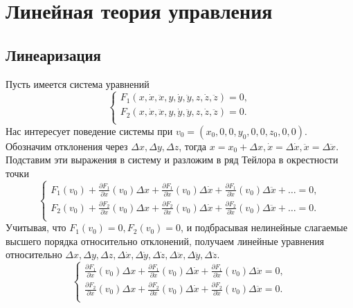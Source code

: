 \documentclass[A4]{article}
\begin{document}
\section{Линейная теория управления}
\subsection{Линеаризация}
Пусть имеется система уравнений
\begin{equation}
\left\{\begin{array}{cc}
F_1(x,\dot{x},\ddot{x},y,\dot{y},\ddot{y},z,\dot{z},\ddot{z})=0,\\
F_2(x,\dot{x},\ddot{x},y,\dot{y},\ddot{y},z,\dot{z},\ddot{z})=0.\\
\end{array}\right.
\end{equation}
Нас интересует поведение системы при $v_0=(x_0,0,0,y_0,0,0,z_0,0,0)$. Обозначим отклонения через $\Delta x,\Delta y,\Delta z$, тогда $x=x_0+\Delta x,\dot{x}=\Delta\dot{x}, \ddot{x}=\Delta\ddot{x}$. Подставим эти выражения в систему и разложим в ряд Тейлора в окрестности точки
\begin{equation}
\left\{\begin{array}{cc}
F_1(v_0)+\frac{\partial F_1}{\partial x}(v_0)\Delta x+\frac{\partial F_1}{\partial \dot{x}}(v_0)\Delta \dot{x}+\frac{\partial F_1}{\partial \ddot{x}}(v_0)\Delta \ddot{x}+\ldots=0,\\
F_2(v_0)+\frac{\partial F_2}{\partial x}(v_0)\Delta x+\frac{\partial F_2}{\partial \dot{x}}(v_0)\Delta \dot{x}+\frac{\partial F_2}{\partial \ddot{x}}(v_0)\Delta \ddot{x}+\ldots=0.\\
\end{array}\right.
\end{equation}
Учитывая, что $F_1(v_0)=0,F_2(v_0)=0$, и подбрасывая нелинейные слагаемые высшего порядка относительно отклонений, получаем линейные уравнения относительно $\Delta x,\Delta y,\Delta z,\Delta \dot{x},\Delta \dot{y},\Delta \dot{z},\Delta \ddot{x},\Delta \ddot{y},\Delta \ddot{z}$.
\begin{equation}
\left\{\begin{array}{cc}
\frac{\partial F_1}{\partial x}(v_0)\Delta x+\frac{\partial F_1}{\partial \dot{x}}(v_0)\Delta \dot{x}+\frac{\partial F_1}{\partial \ddot{x}}(v_0)\Delta \ddot{x}=0,\\
\frac{\partial F_2}{\partial x}(v_0)\Delta x+\frac{\partial F_2}{\partial \dot{x}}(v_0)\Delta \dot{x}+\frac{\partial F_2}{\partial \ddot{x}}(v_0)\Delta \ddot{x}=0.\\
\end{array}\right.
\end{equation}
\end{document}
